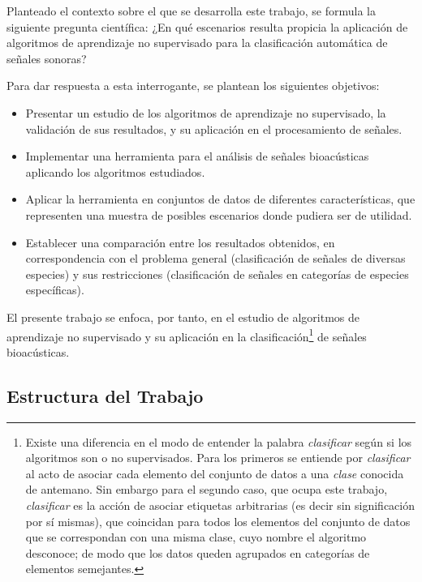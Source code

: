 Planteado el contexto sobre el que se desarrolla este trabajo, se formula la siguiente pregunta científica: ¿En qué escenarios resulta propicia la aplicación de algoritmos de aprendizaje no supervisado para la clasificación automática de señales sonoras?

Para dar respuesta a esta interrogante, se plantean los siguientes objetivos:
\begin{itemize}
    \item Presentar un estudio de los algoritmos de aprendizaje no supervisado, la validación de sus resultados, y su aplicación en el procesamiento de señales.
    \item Implementar una herramienta para el análisis de señales bioacústicas aplicando los algoritmos estudiados.
    \item Aplicar la herramienta en conjuntos de datos de diferentes características, que representen una muestra de posibles escenarios donde pudiera ser de utilidad.
    \item Establecer una comparación entre los resultados obtenidos, en correspondencia con el problema general (clasificación de señales de diversas especies) y sus restricciones (clasificación de señales en categorías de especies específicas).
\end{itemize}

El presente trabajo se enfoca, por tanto, en el estudio de algoritmos de aprendizaje no supervisado y su aplicación en la clasificación\footnote{Existe una diferencia en el modo de entender la palabra \textit{clasificar} según si los algoritmos son o no supervisados. Para los primeros se entiende por \textit{clasificar} al acto de asociar cada elemento del conjunto de datos a una \textit{clase} conocida de antemano. Sin embargo para el segundo caso, que ocupa este trabajo, \textit{clasificar} es la acción de asociar etiquetas arbitrarias (es decir sin significación por sí mismas), que coincidan para todos los elementos del conjunto de datos que se correspondan con una misma clase, cuyo nombre el algoritmo desconoce; de modo que los datos queden agrupados en categorías de elementos semejantes.} de señales bioacústicas.

\subsection*{Estructura del Trabajo}\label{subsec:estructuraDelTrabajo}

